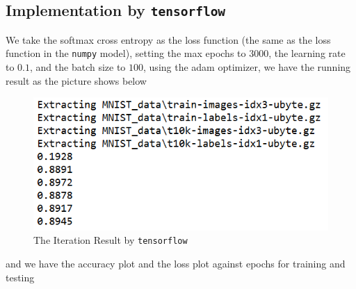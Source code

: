 \documentclass[10pt]{article}
\begin{document}
\subsection{Implementation by \texttt{tensorflow}}
We take the softmax cross entropy as the loss function (the same as the loss function in the \texttt{numpy} model), setting the max epochs to $3000$, the learning rate to $0.1$, and the batch size to $100$, using the adam optimizer, we have the running result as the picture shows below
\begin{figure}[H]
\centering
\includegraphics[scale=0.9]{fig3.png}
\caption{The Iteration Result by \texttt{tensorflow}}
\label{fig3}
\end{figure}
and we have the accuracy plot and the loss plot against epochs for training and testing
\end{document}
